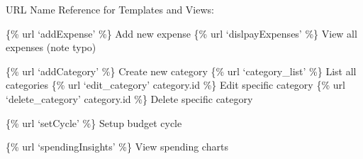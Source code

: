 \documentclass[letterpaper,10pt,english]{sphinxmanual}
\begin{document}
\begin{fulllineitems}
\label{\detokenize{expensesApp:expensesApp.urls.urlpatterns}}
\pysigstartsignatures
\pysigline
{}
\pysigstopsignatures
\sphinxAtStartPar
URL Name Reference for Templates and Views:
\begin{description}
\sphinxAtStartPar
\{\% url ‘addExpense’ \%\}              \sphinxhyphen{} Add new expense
\{\% url ‘dislpayExpenses’ \%\}         \sphinxhyphen{} View all expenses (note typo)

\sphinxAtStartPar
\{\% url ‘addCategory’ \%\}             \sphinxhyphen{} Create new category
\{\% url ‘category\_list’ \%\}           \sphinxhyphen{} List all categories
\{\% url ‘edit\_category’ category.id \%\} \sphinxhyphen{} Edit specific category
\{\% url ‘delete\_category’ category.id \%\} \sphinxhyphen{} Delete specific category

\sphinxAtStartPar
\{\% url ‘setCycle’ \%\}                \sphinxhyphen{} Setup budget cycle

\sphinxAtStartPar
\{\% url ‘spendingInsights’ \%\}        \sphinxhyphen{} View spending charts


\end{description}
\end{fulllineitems}
\end{document}
